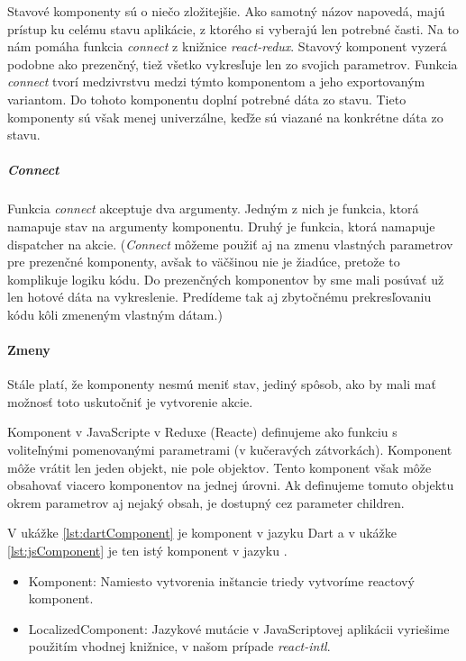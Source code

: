 Stavové komponenty sú o niečo zložitejšie. Ako samotný názov napovedá, majú prístup ku celému stavu aplikácie, z ktorého si vyberajú len potrebné časti. Na to nám pomáha funkcia \emph{connect} z knižnice \emph{react-redux}. Stavový komponent vyzerá podobne ako prezenčný, tiež všetko vykresľuje len zo svojich parametrov. 
Funkcia \emph{connect} tvorí medzivrstvu medzi týmto komponentom a jeho exportovaným variantom. Do tohoto komponentu doplní potrebné dáta zo stavu. Tieto komponenty sú však menej univerzálne, keďže sú viazané na konkrétne dáta zo stavu.

\subparagraph{Connect}
\label{func:connect}%
Funkcia \emph{connect} akceptuje dva argumenty. Jedným z nich je funkcia, ktorá namapuje stav na argumenty komponentu. Druhý je funkcia, ktorá namapuje dispatcher na akcie. %
(\emph{Connect} môžeme použiť aj na zmenu vlastných parametrov pre prezenčné komponenty, avšak to väčšinou nie je žiadúce, pretože to komplikuje logiku kódu. Do prezenčných komponentov by sme mali posúvať už len hotové dáta na vykreslenie. Predídeme tak aj zbytočnému prekresľovaniu kódu kôli zmeneným vlastným dátam.)

\paragraph{Zmeny}

%

Stále platí, že komponenty nesmú meniť stav, jediný spôsob, ako by mali mať možnosť toto uskutočniť je vytvorenie akcie.

Komponent v JavaScripte v Reduxe (Reacte) %
definujeme ako funkciu s voliteľnými pomenovanými parametrami (v kučeravých zátvorkách). %
Komponent môže vrátit len jeden objekt, nie pole objektov. Tento komponent však môže obsahovať viacero komponentov na jednej úrovni.
Ak definujeme tomuto objektu okrem parametrov aj nejaký obsah, je dostupný cez parameter children.%

V ukážke \ref{lst:dartComponent} je komponent v jazyku Dart a v ukážke \ref{lst:jsComponent} je ten istý komponent v jazyku \JS{}.

\begin{itemize}
\item {Komponent}: Namiesto vytvorenia inštancie triedy vytvoríme reactový komponent.

\item {LocalizedComponent}: Jazykové mutácie v JavaScriptovej aplikácii vyriešime použitím vhodnej knižnice, v našom prípade \emph{react-intl}. %
\end{itemize}

